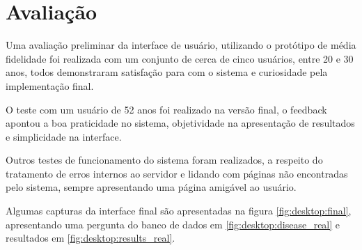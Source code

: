 \section{Avaliação}

Uma avaliação preliminar da interface de usuário, utilizando o protótipo de média fidelidade foi realizada com um conjunto de cerca de cinco usuários, entre 20 e 30 anos, todos demonstraram satisfação para com o sistema e curiosidade pela implementação final.

O teste com um usuário de 52 anos foi realizado na versão final, o feedback apontou a boa praticidade no sistema, objetividade na apresentação de resultados e simplicidade na interface.

Outros testes de funcionamento do sistema foram realizados, a respeito do tratamento de erros internos ao servidor e lidando com páginas não encontradas pelo sistema, sempre apresentando uma página amigável ao usuário.

Algumas capturas da interface final são apresentadas na figura \ref{fig:desktop:final}, apresentando uma pergunta do banco de dados em \ref{fig:desktop:disease_real} e resultados em \ref{fig:desktop:results_real}.

